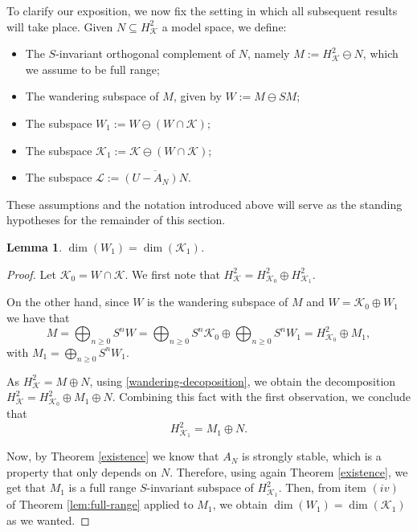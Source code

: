 \documentclass[a4paper,12pt]{amsart}
\def\KK{{\mathcal{K}}}
\newtheorem{lemma}[theorem]{Lemma}
\theoremstyle{definition}
\begin{document}
To clarify our exposition, we now fix the setting in which all subsequent results will take place. Given $N\subseteq H^2_{\KK}$ a model space, we define:

\begin{itemize}
\item The $S$-invariant orthogonal complement of $N$, namely $M:= H^2_{\KK}\ominus N$, which we assume to be full range;

\item The wandering subspace of $M$, given by $W:= M\ominus SM$;

\item The subspace $W_1:=W\ominus (W\cap\KK)$;

\item The subspace $\KK_1:=\KK\ominus (W\cap\KK)$;
\item The subspace $\mathcal{L}:=\overline{(U-A_N)N}$.
\end{itemize}

These assumptions and the notation introduced above will serve as the standing hypotheses for the remainder of this section.

\begin{lemma}\label{reduction}
$\dim(W_1)=\dim(\KK_1)$.
\end{lemma}
\begin{proof}
Let $\KK_0= W\cap\KK$. We first note that $H^2_{\KK}=H^2_{\KK_0}\oplus H^2_{\KK_1}.$

On the other hand, since $W$ is the wandering subspace of $M$ and $W=\KK_0\oplus W_1$ we have that 
\begin{equation}\label{wandering-decoposition}
M=\bigoplus_{n\geqslant 0} S^nW=\bigoplus_{n\geqslant 0} S^n\KK_0\oplus\bigoplus_{n\geqslant 0} S^n W_1= H^2_{\KK_0}\oplus M_1,
\end{equation}
with 
$M_1=\bigoplus_{n\geqslant 0} S^nW_1$.

As $H^2_{\KK}=M\oplus N$, using \eqref{wandering-decoposition}, we obtain the decomposition $H^2_{\KK}=H^2_{\KK_0}\oplus M_1\oplus N$. Combining this fact with the first observation, we conclude that 
\begin{equation*}
H^2_{\KK_1}=M_1\oplus N.
\end{equation*}

Now, by Theorem \ref{existence} we know that $A_N$ is strongly stable, which is a property that only depends on $N$. Therefore, using again Theorem \ref{existence}, we get that $M_1$ is a full range $S$-invariant subspace of $H^2_{\KK_1}$. Then, from item $(iv)$ of Theorem \ref{lem:full-range} applied to $M_1$, we obtain $\dim(W_1)=\dim(\KK_1)$ as we wanted. 
\end{proof}
\end{document}
